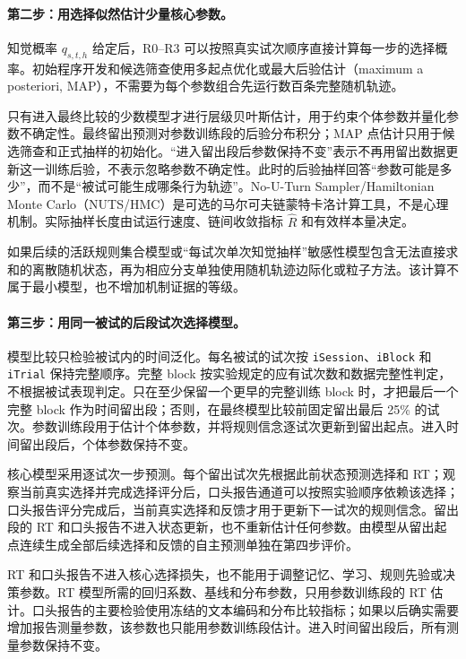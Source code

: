 \paragraph{第二步：用选择似然估计少量核心参数。}
知觉概率 $q_{s,t,h}$ 给定后，R0--R3 可以按照真实试次顺序直接计算每一步的选择概率。初始程序开发和候选筛查使用多起点优化或最大后验估计（maximum a posteriori, MAP），不需要为每个参数组合先运行数百条完整随机轨迹。

只有进入最终比较的少数模型才进行层级贝叶斯估计，用于约束个体参数并量化参数不确定性。最终留出预测对参数训练段的后验分布积分；MAP 点估计只用于候选筛查和正式抽样的初始化。“进入留出段后参数保持不变”表示不再用留出数据更新这一训练后验，不表示忽略参数不确定性。此时的后验抽样回答“参数可能是多少”，而不是“被试可能生成哪条行为轨迹”。No-U-Turn Sampler/Hamiltonian Monte Carlo（NUTS/HMC）是可选的马尔可夫链蒙特卡洛计算工具，不是心理机制。实际抽样长度由试运行速度、链间收敛指标 $\widehat R$ 和有效样本量决定。

如果后续的活跃规则集合模型或“每试次单次知觉抽样”敏感性模型包含无法直接求和的离散随机状态，再为相应分支单独使用随机轨迹边际化或粒子方法。该计算不属于最小模型，也不增加机制证据的等级。

\paragraph{第三步：用同一被试的后段试次选择模型。}
模型比较只检验被试内的时间泛化。每名被试的试次按 \texttt{iSession}、\texttt{iBlock} 和 \texttt{iTrial} 保持完整顺序。完整 block 按实验规定的应有试次数和数据完整性判定，不根据被试表现判定。只在至少保留一个更早的完整训练 block 时，才把最后一个完整 block 作为时间留出段；否则，在最终模型比较前固定留出最后 25\% 的试次。参数训练段用于估计个体参数，并将规则信念逐试次更新到留出起点。进入时间留出段后，个体参数保持不变。

核心模型采用逐试次一步预测。每个留出试次先根据此前状态预测选择和 RT；观察当前真实选择并完成选择评分后，口头报告通道可以按照实验顺序依赖该选择；口头报告评分完成后，当前真实选择和反馈才用于更新下一试次的规则信念。留出段的 RT 和口头报告不进入状态更新，也不重新估计任何参数。由模型从留出起点连续生成全部后续选择和反馈的自主预测单独在第四步评价。

RT 和口头报告不进入核心选择损失，也不能用于调整记忆、学习、规则先验或决策参数。RT 模型所需的回归系数、基线和分布参数，只用参数训练段的 RT 估计。口头报告的主要检验使用冻结的文本编码和分布比较指标；如果以后确实需要增加报告测量参数，该参数也只能用参数训练段估计。进入时间留出段后，所有测量参数保持不变。

